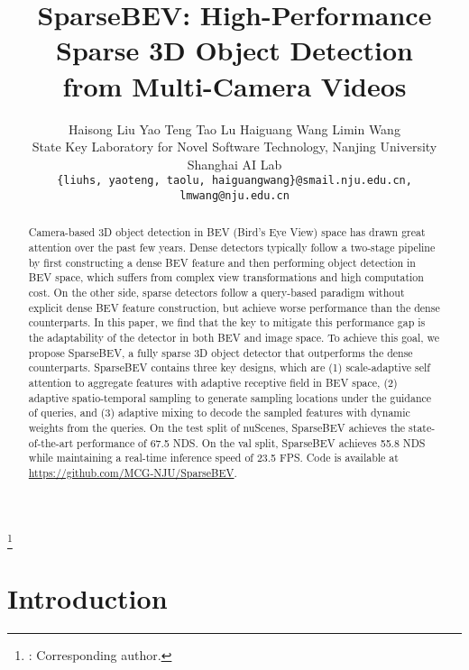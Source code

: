 \documentclass[10pt,twocolumn,letterpaper]{article}
\newcommand\blfootnote[1]{\begingroup
  \renewcommand\thefootnote{}\footnote{#1}\addtocounter{footnote}{-1}\endgroup
}
\begin{document}
\title{SparseBEV: High-Performance Sparse 3D Object Detection \\ from Multi-Camera Videos}

\author{
Haisong Liu  \quad Yao Teng  \quad Tao Lu  \quad Haiguang Wang  \quad Limin Wang  \textsuperscript{\Letter} \\
State Key Laboratory for Novel Software Technology, Nanjing University \quad Shanghai AI Lab \\
\small\texttt{\{liuhs, yaoteng, taolu, haiguangwang\}@smail.nju.edu.cn, lmwang@nju.edu.cn}
}

\maketitle


\begin{abstract}
  Camera-based 3D object detection in BEV (Bird's Eye View) space has drawn great attention over the past few years.
  Dense detectors typically follow a two-stage pipeline by first constructing a dense BEV feature and then performing object detection in BEV space, which suffers from complex view transformations and high computation cost.
  On the other side, sparse detectors follow a query-based paradigm without explicit dense BEV feature construction, but achieve worse performance than the dense counterparts.
  In this paper, we find that the key to mitigate this performance gap is the adaptability of the detector in both BEV and image space.
  To achieve this goal, we propose SparseBEV, a fully sparse 3D object detector that outperforms the dense counterparts.
  SparseBEV contains three key designs, which are (1) scale-adaptive self attention to aggregate features with adaptive receptive field in BEV space, (2) adaptive spatio-temporal sampling to generate sampling locations under the guidance of queries, and (3) adaptive mixing to decode the sampled features with dynamic weights from the queries.
  On the test split of nuScenes, SparseBEV achieves the state-of-the-art performance of 67.5 NDS. On the val split, SparseBEV achieves 55.8 NDS while maintaining a real-time inference speed of 23.5 FPS.
  Code is available at \url{https://github.com/MCG-NJU/SparseBEV}.
\end{abstract}
\blfootnote{\Letter: Corresponding author.}

\section{Introduction}
\end{document}
